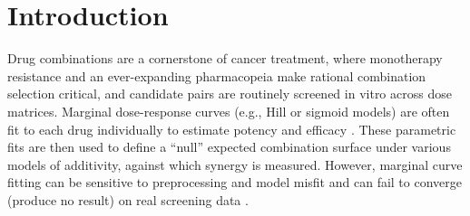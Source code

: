 \documentclass[unnumsec,webpdf,contemporary,large]{oup-authoring-template}
\begin{document}

\maketitle

\section{Introduction}

Drug combinations are a cornerstone of cancer treatment, where monotherapy resistance and an ever-expanding pharmacopeia make rational combination selection critical, and candidate pairs are routinely screened in vitro across dose matrices.
Marginal dose-response curves (e.g., Hill or sigmoid models) are often fit to each drug individually to estimate potency and efficacy \cite{Huang2012,He2018}.
These parametric fits are then used to define a ``null'' expected combination surface under various models of additivity, against which synergy is measured.
However, marginal curve fitting can be sensitive to preprocessing and model misfit \cite{MuSyC2021} and can fail to converge (produce no result) on real screening data \cite{SynergyFinder2017}.
\end{document}
